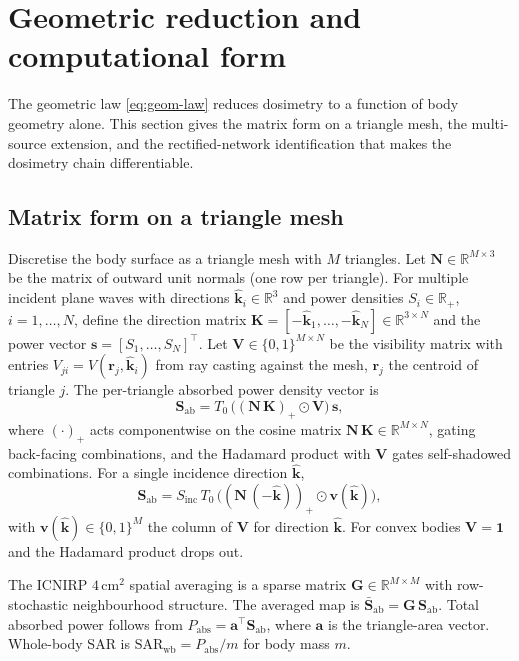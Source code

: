 \documentclass[journal,twocolumn,10pt]{IEEEtran}
\theoremstyle{plain}
\theoremstyle{remark}
\newcommand{\khat}{\hat{\bm{k}}}
\newcommand{\rr}{\mathbf{r}}
\newcommand{\Sinc}{S_{\mathrm{inc}}}
\newcommand{\pospart}[1]{\left(#1\right)_{+}}
\newcommand{\Vis}{V}
\begin{document}
\section{Geometric reduction and computational form}\label{sec:geo}

The geometric law \eqref{eq:geom-law} reduces dosimetry to a
function of body geometry alone. This section gives the matrix form
on a triangle mesh, the multi-source extension, and the rectified-network
identification that makes the dosimetry chain differentiable.

\subsection{Matrix form on a triangle mesh}
Discretise the body surface as a triangle mesh with $M$ triangles.
Let $\mathbf{N} \in \mathbb{R}^{M \times 3}$ be the matrix of
outward unit normals (one row per triangle). For multiple incident
plane waves with directions $\khat_i \in \mathbb{R}^3$ and power
densities $S_i \in \mathbb{R}_+$, $i = 1, \ldots, N$, define the
direction matrix $\mathbf{K} = [-\khat_1, \ldots, -\khat_N] \in
\mathbb{R}^{3 \times N}$ and the power vector $\mathbf{s} = [S_1,
\ldots, S_N]^\top$. Let $\mathbf{V} \in \{0, 1\}^{M \times N}$ be the
visibility matrix with entries $V_{ji} = \Vis(\rr_j, \khat_i)$ from
ray casting against the mesh, $\rr_j$ the centroid of triangle $j$.
The per-triangle absorbed power density vector is
\begin{equation}\label{eq:mat-multi}
  \mathbf{S}_{\mathrm{ab}} = T_0\,\bigl(\pospart{\mathbf{N}\,\mathbf{K}}
  \odot \mathbf{V}\bigr)\,\mathbf{s},
\end{equation}
where $(\cdot)_+$ acts componentwise on the cosine matrix
$\mathbf{N}\,\mathbf{K} \in \mathbb{R}^{M \times N}$, gating
back-facing combinations, and the Hadamard product with $\mathbf{V}$
gates self-shadowed combinations. For a single incidence
direction $\khat$,
\begin{equation}\label{eq:mat-single}
  \mathbf{S}_{\mathrm{ab}} = \Sinc \, T_0 \,
  \bigl(\pospart{\mathbf{N}\,(-\khat)} \odot \mathbf{v}(\khat)\bigr),
\end{equation}
with $\mathbf{v}(\khat) \in \{0,1\}^M$ the column of $\mathbf{V}$ for
direction $\khat$. For convex bodies $\mathbf{V} = \mathbf{1}$ and
the Hadamard product drops out.

The ICNIRP $4\,\mathrm{cm}^2$ spatial averaging is a sparse matrix
$\mathbf{G} \in \mathbb{R}^{M \times M}$ with row-stochastic
neighbourhood structure. The averaged map is
$\bar{\mathbf{S}}_{\mathrm{ab}} = \mathbf{G}\,\mathbf{S}_{\mathrm{ab}}$.
Total absorbed power follows from $P_{\mathrm{abs}} = \mathbf{a}^\top
\mathbf{S}_{\mathrm{ab}}$, where $\mathbf{a}$ is the triangle-area
vector. Whole-body SAR is $\mathrm{SAR}_{\mathrm{wb}} =
P_{\mathrm{abs}} / m$ for body mass $m$.
\end{document}
